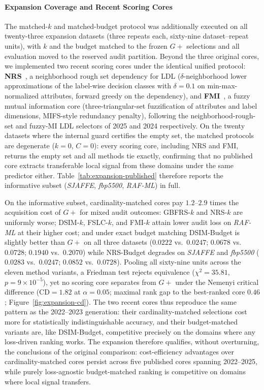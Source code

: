 \paragraph{Expansion Coverage and Recent Scoring Cores}
\label{par:published-expansion}
The matched-$k$ and matched-budget protocol was additionally executed on all twenty-three expansion datasets (three repeats each, sixty-nine dataset--repeat units), with $k$ and the budget matched to the frozen $G+$ selections and all evaluation moved to the reserved audit partition. Beyond the three original cores, we implemented two recent scoring cores under the identical unified protocol: \textbf{NRS}~\cite{Wu2025NRS}, a neighborhood rough set dependency for LDL ($\delta$-neighborhood lower approximations of the label-wise decision classes with $\delta = 0.1$ on min-max-normalized attributes, forward greedy on the dependency), and \textbf{FMI}~\cite{You2024FMI}, a fuzzy mutual information core (three-triangular-set fuzzification of attributes and label dimensions, MIFS-style redundancy penalty), following the neighborhood-rough-set and fuzzy-MI LDL selectors of 2025 and 2024 respectively. On the twenty datasets where the internal guard certifies the empty set, the matched protocols are degenerate ($k=0$, $C=0$): every scoring core, including NRS and FMI, returns the empty set and all methods tie exactly, confirming that no published core extracts transferable local signal from these domains under the same predictor either. Table~\ref{tab:expansion-published} therefore reports the informative subset (\textit{SJAFFE}, \textit{fbp5500}, \textit{RAF-ML}) in full.



On the informative subset, cardinality-matched cores pay $1.2$--$2.9$ times the acquisition cost of $G+$ for mixed audit outcomes: GBFRS-$k$ and NRS-$k$ are uniformly worse; DSIM-$k$, FSLC-$k$, and FMI-$k$ attain lower audit loss on \textit{RAF-ML} at their higher cost; and under exact budget matching DSIM-Budget is slightly better than $G+$ on all three datasets ($0.0222$ vs.\ $0.0247$; $0.0678$ vs.\ $0.0728$; $0.1940$ vs.\ $0.2070$) while NRS-Budget degrades on \textit{SJAFFE} and \textit{fbp5500} ($0.0283$ vs.\ $0.0247$; $0.0852$ vs.\ $0.0728$). Pooling all sixty-nine units across the eleven method variants, a Friedman test rejects equivalence ($\chi^2 = 35.81$, $p = 9\times10^{-5}$), yet no scoring core separates from $G+$ under the Nemenyi critical difference ($\mathrm{CD} = 1.82$ at $\alpha = 0.05$; maximal rank gap to the best-ranked core $0.46$; Figure~\ref{fig:expansion-cd}). The two recent cores thus reproduce the same pattern as the 2022--2023 generation: their cardinality-matched selections cost more for statistically indistinguishable accuracy, and their budget-matched variants are, like DSIM-Budget, competitive precisely on the domains where any loss-driven ranking works. The expansion therefore qualifies, without overturning, the conclusions of the original comparison: cost-efficiency advantages over cardinality-matched cores persist across five published cores spanning 2022--2025, while purely loss-agnostic budget-matched ranking is competitive on domains where local signal transfers.

